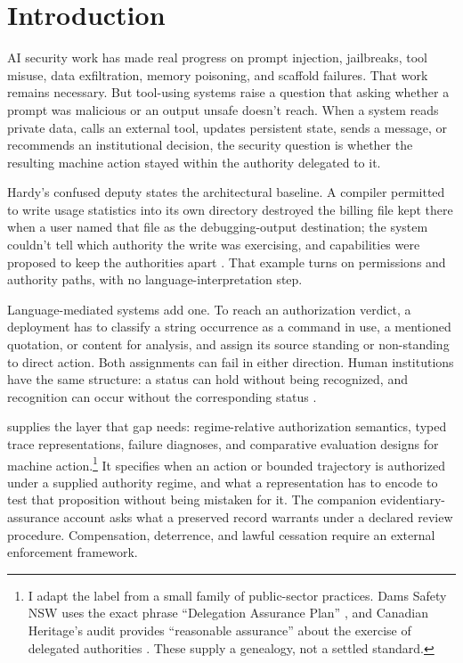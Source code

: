 \section{Introduction}

AI security work has made real progress on prompt injection, jailbreaks, tool misuse, data exfiltration, memory poisoning, and scaffold failures. That work remains necessary. But tool-using systems raise a question that asking whether a prompt was malicious or an output unsafe doesn't reach. When a system reads private data, calls an external tool, updates persistent state, sends a message, or recommends an institutional decision, the security question is whether the resulting machine action stayed within the authority delegated to it.

Hardy's confused deputy states the architectural baseline. A compiler permitted to write usage statistics into its own directory destroyed the billing file kept there when a user named that file as the debugging-output destination; the system couldn't tell which authority the write was exercising, and capabilities were proposed to keep the authorities apart \citep{hardy1988confusedDeputy}. That example turns on permissions and authority paths, with no language-interpretation step.

Language-mediated systems add one. To reach an authorization verdict, a deployment has to classify a string occurrence as a command in use, a mentioned quotation, or content for analysis, and assign its source standing or non-standing to direct action. Both assignments can fail in either direction. Human institutions have the same structure: a status can hold without being recognized, and recognition can occur without the corresponding status \citep{reynolds2026effectiveWithoutWarrant}.

 supplies the layer that gap needs: regime-relative authorization semantics, typed trace representations, failure diagnoses, and comparative evaluation designs for machine action.\footnote{I adapt the label from a small family of public-sector practices. Dams Safety NSW uses the exact phrase \enquote{Delegation Assurance Plan} \parencite{damsSafetyNSW2020delegationPlan}, and Canadian Heritage's audit provides \enquote{reasonable assurance} about the exercise of delegated authorities \parencite{canadianHeritage2026delegatedAuthoritiesAudit}. These supply a genealogy, not a settled standard.} It specifies when an action or bounded trajectory is authorized under a supplied authority regime, and what a representation has to encode to test that proposition without being mistaken for it. The companion evidentiary-assurance account \parencite{reynolds2026evidentiaryAssurance} asks what a preserved record warrants under a declared review procedure. Compensation, deterrence, and lawful cessation require an external enforcement framework.

